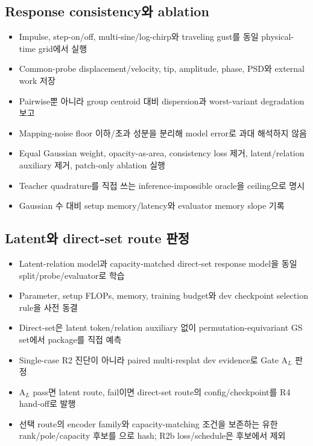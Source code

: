 \documentclass[10pt,a4paper]{article}
\begin{document}
\subsection{Response consistency와 ablation}

\begin{itemize}
  \item[$\square$] Impulse, step-on/off, multi-sine/log-chirp와 traveling gust를 동일 physical-time grid에서 실행
  \item[$\square$] Common-probe displacement/velocity, tip, amplitude, phase, PSD와 external work 저장
  \item[$\square$] Pairwise뿐 아니라 group centroid 대비 dispersion과 worst-variant degradation 보고
  \item[$\square$] Mapping-noise floor 이하/초과 성분을 분리해 model error로 과대 해석하지 않음
  \item[$\square$] Equal Gaussian weight, opacity-as-area, consistency loss 제거,
  latent/relation auxiliary 제거, patch-only ablation 실행
  \item[$\square$] Teacher quadrature를 직접 쓰는 inference-impossible oracle을 ceiling으로 명시
  \item[$\square$] Gaussian 수 대비 setup memory/latency와 evaluator memory slope 기록
\end{itemize}

\subsection{Latent와 direct-set route 판정}

\begin{itemize}
  \item[$\square$] Latent-relation model과 capacity-matched direct-set response model을 동일 split/probe/evaluator로 학습
  \item[$\square$] Parameter, setup FLOPs, memory, training budget와 dev checkpoint selection rule을 사전 동결
  \item[$\square$] Direct-set은 latent token/relation auxiliary 없이 permutation-equivariant GS set에서 package를 직접 예측
  \item[$\square$] Single-case R2 진단이 아니라 paired multi-resplat dev evidence로 Gate A\(_L\) 판정
  \item[$\square$] A\(_L\) pass면 latent route, fail이면 direct-set route의 config/checkpoint를 R4 hand-off로 발행
  \item[$\square$] 선택 route의 encoder family와 capacity-matching 조건을 보존하는 유한 rank/pole/capacity
  후보를 으로 hash; R2b loss/schedule은 후보에서 제외
\end{itemize}
\end{document}
